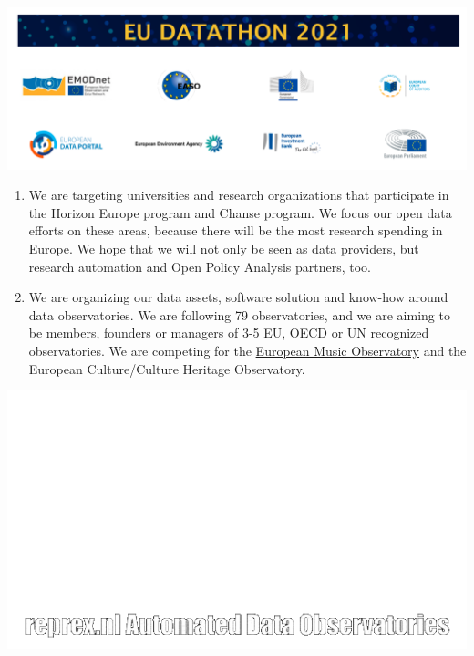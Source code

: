 \documentclass[
  fontsize=13pt,
  english,
  a4paper,
  openany, a4paper, oneside]{book}
\begin{document}
\begin{center}\includegraphics[width=17.64in]{plots/EU-Datathlon-2021-partners} \end{center}

\begin{enumerate}
\def\labelenumi{\arabic{enumi}.}
\setcounter{enumi}{1}
\item
  We are targeting universities and research organizations that participate in the Horizon Europe program and Chanse program. We focus our open data efforts on these areas, because there will be the most research spending in Europe. We hope that we will not only be seen as data providers, but research automation and Open Policy Analysis partners, too.
\item
  We are organizing our data assets, software solution and know-how around data observatories. We are following 79 observatories, and we are aiming to be members, founders or managers of 3-5 EU, OECD or UN recognized observatories. We are competing for the \protect\hyperlink{emo}{European Music Observatory} and the European Culture/Culture Heritage Observatory.
\end{enumerate}

\begin{center}\includegraphics{gifs/observatory_overview_2021_03_26_captions} \end{center}
\end{document}
